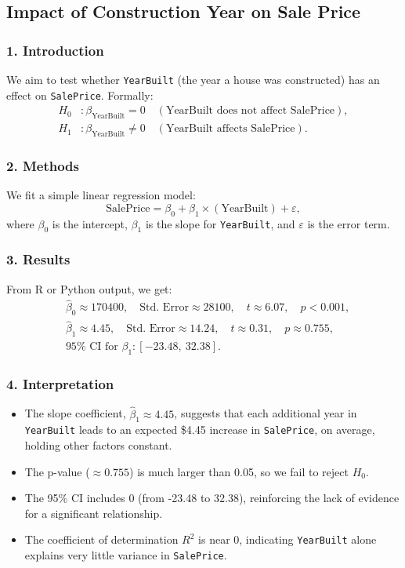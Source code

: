 \documentclass{article}
\begin{document}
\subsection*{Impact of Construction Year on Sale Price}

\subsubsection*{1. Introduction}
We aim to test whether \texttt{YearBuilt} (the year a house was constructed) has an effect on \texttt{SalePrice}. Formally:
\[
\begin{aligned}
H_0 &: \beta_{\text{YearBuilt}} = 0 \quad (\text{YearBuilt does not affect SalePrice}),\\
H_1 &: \beta_{\text{YearBuilt}} \neq 0 \quad (\text{YearBuilt affects SalePrice}).
\end{aligned}
\]

\subsubsection*{2. Methods}
We fit a simple linear regression model:
\[
\text{SalePrice} = \beta_0 + \beta_1 \times (\text{YearBuilt}) + \varepsilon,
\]
where \(\beta_0\) is the intercept, \(\beta_1\) is the slope for \texttt{YearBuilt}, and \(\varepsilon\) is the error term.

\subsubsection*{3. Results}

From R or Python output, we get:
\[
\begin{aligned}
&\hat{\beta}_0 \approx 170400,
  \quad \text{Std.\ Error} \approx 28100,
  \quad t \approx 6.07,
  \quad p < 0.001, \\
&\hat{\beta}_1 \approx 4.45,
  \quad \text{Std.\ Error} \approx 14.24,
  \quad t \approx 0.31,
  \quad p \approx 0.755, \\
& 95\%\text{ CI for } \beta_1: [-23.48,\ 32.38].
\end{aligned}
\]

\subsubsection*{4. Interpretation}

\begin{itemize}
    \item The slope coefficient, \(\hat{\beta}_1\approx 4.45\), suggests that each additional year in \texttt{YearBuilt} leads to an expected \$4.45 increase in \texttt{SalePrice}, on average, holding other factors constant.
    \item The p-value (\(\approx 0.755\)) is much larger than 0.05, so we fail to reject \(H_0\).
    \item The 95\% CI includes 0 (from -23.48 to 32.38), reinforcing the lack of evidence for a significant relationship.
    \item The coefficient of determination \(R^2\) is near 0, indicating \texttt{YearBuilt} alone explains very little variance in \texttt{SalePrice}.
\end{itemize}
\end{document}
